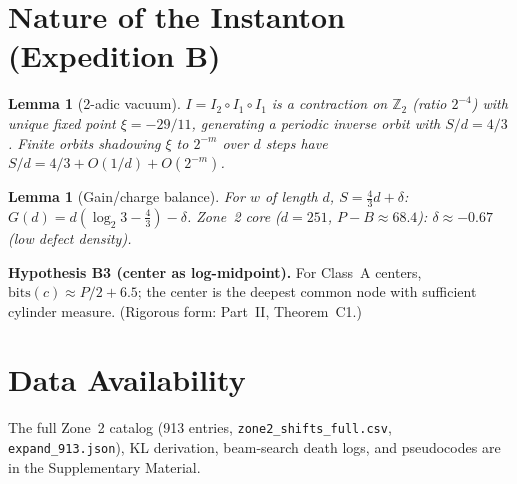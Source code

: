 \documentclass[12pt,a4paper]{article}
\newtheorem{lemma}[theorem]{Lemma}
\theoremstyle{remark}
\begin{document}
\section{Nature of the Instanton (Expedition B)}
\begin{lemma}[2-adic vacuum]
$I=I_2\circ I_1\circ I_1$ is a contraction on $\mathbb Z_2$ (ratio $2^{-4}$) with unique fixed point $\xi=-29/11$, generating a periodic inverse orbit with $S/d=4/3$. Finite orbits shadowing $\xi$ to $2^{-m}$ over $d$ steps have $S/d=4/3+O(1/d)+O(2^{-m})$.
\end{lemma}
\begin{lemma}[Gain/charge balance]
For $w$ of length $d$, $S=\tfrac43 d+\delta$: $G(d)=d(\log_2 3-\tfrac43)-\delta$. Zone~2 core ($d=251$, $P-B\approx68.4$): $\delta\approx-0.67$ (low defect density).
\end{lemma}
\textbf{Hypothesis B3 (center as log-midpoint).} For Class~A centers, $\mathrm{bits}(c)\approx P/2+6.5$; the center is the deepest common node with sufficient cylinder measure. (Rigorous form: Part~II, Theorem~C1.)

\section*{Data Availability}
The full Zone~2 catalog (913 entries, \texttt{zone2\_shifts\_full.csv}, \texttt{expand\_913.json}), KL derivation, beam-search death logs, and pseudocodes are in the Supplementary Material.
\end{document}
